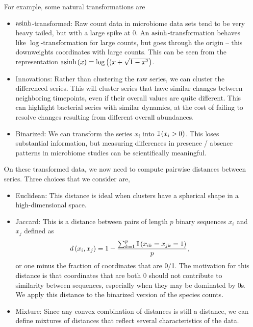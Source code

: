 \documentclass{article}
\begin{document}
For example, some natural transformations are
\begin{itemize}
\item $\mathop\mathrm{asinh}$-transformed: Raw count data in microbiome data sets tend to
  be very heavy tailed, but with a large spike at 0. An $\mathop\mathrm{asinh}$-transformation
  behaves like $\log$-transformation for large counts, but goes through the
  origin -- this downweights coordinates with large counts. This can be seen
  from the representation $\mathop\mathrm{asinh}\left(x\right) = \log\left((x + \sqrt{1 -
      x^{2}}\right)$.
\item Innovations: Rather than clustering the raw series, we can cluster the
  differenced series. This will cluster series that have similar changes between
  neighboring timepoints, even if their overall values are quite different. This
  can highlight bacterial series with similar dynamics, at the cost of failing
  to resolve changes resulting from different overall abundances.
\item Binarized: We can transform the series $x_{i}$ into $\mathbb{I}\left({x_{i} > 0}\right)$.
  This loses substantial information, but measuring differences in presence /
  absence patterns in microbiome studies can be scientifically meaningful.
\end{itemize}

On these transformed data, we now need to compute pairwise distances between
series. Three choices that we consider are,
\begin{itemize}
\item Euclidean: This distance is ideal when clusters have a spherical shape in
  a high-dimensional space.
\item Jaccard: This is a distance between pairs of length $p$ binary sequences
  $x_{i}$ and $x_{j}$ defined as
\begin{align}
  d\left(x_{i}, x_{j}\right) &= 1 - \frac{\sum_{k = 1}^{p} \mathbb{I}\left({x_{ik} = x_{jk} = 1}\right)}{p},
\end{align}
or one minus the fraction of coordinates that are 0/1. The motivation for this
distance is that coordinates that are both 0 should not contribute to similarity
between sequences, especially when they may be dominated by 0s. We apply this
distance to the binarized version of the species counts.
\item Mixture: Since any convex combination of distances is still a distance, we
  can define mixtures of distances that reflect several characteristics of the
  data.
\end{itemize}
\end{document}
